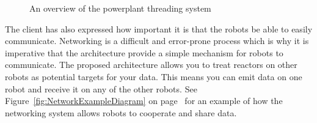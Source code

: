 \documentclass[english,12pt]{scrartcl}
\begin{document}
\begin{landscape}
\begin{figure}[h]
				\caption {An overview of the \gls{powerplant} threading system}
				\label{fig:PowerPlantThreadingOverviewDiagram}
			\end{figure}
			\end{landscape}

			The client has also expressed how important it is that the robots be able to easily communicate.
			Networking is a difficult and error-prone process which is why it is imperative that the architecture provide a simple mechanism for robots to communicate.
			The proposed architecture allows you to treat \glspl{reactor} on other robots as potential targets for your data.
			This means you can emit data on one robot and receive it on any of the other robots.
			See Figure~\ref{fig:NetworkExampleDiagram} on page~\pageref{fig:NetworkExampleDiagram} for an example of how the networking system allows robots to cooperate and share data.
\end{document}
